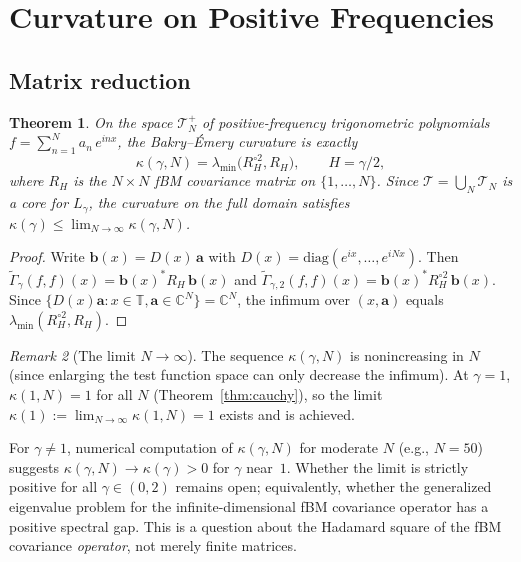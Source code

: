 \documentclass[11pt,a4paper]{article}
\theoremstyle{plain}
\newtheorem{theorem}{Theorem}[section]
\theoremstyle{definition}
\theoremstyle{remark}
\newtheorem{remark}[theorem]{Remark}
\newcommand{\C}{\mathbb{C}}
\newcommand{\T}{\mathbb{T}}
\begin{document}
\section{Curvature on Positive Frequencies}\label{sec:curvature}

\subsection{Matrix reduction}\label{sec:curv-pos}

\begin{theorem}\label{thm:curvature}
On the space $\mathcal{T}_N^+$ of positive-frequency trigonometric
polynomials $f = \sum_{n=1}^N a_n\,e^{inx}$, the Bakry--\'Emery
curvature is exactly
\begin{equation}\label{eq:kappa-def}
  \kappa(\gamma,N) = \lambda_{\min}\!\bigl(R_H^{\circ 2}, R_H\bigr),
  \qquad H = \gamma/2,
\end{equation}
where $R_H$ is the $N \times N$ fBM covariance matrix on $\{1,\ldots,N\}$.
Since $\mathcal{T} = \bigcup_N \mathcal{T}_N$ is a core for $L_\gamma$,
the curvature on the full domain satisfies
$\kappa(\gamma) \leq \lim_{N\to\infty} \kappa(\gamma,N)$.
\end{theorem}

\begin{proof}
Write $\mathbf{b}(x) = D(x)\,\mathbf{a}$ with
$D(x) = \mathrm{diag}(e^{ix},\ldots,e^{iNx})$. Then
$\widetilde{\Gamma}_\gamma(f,f)(x) = \mathbf{b}(x)^* R_H\,\mathbf{b}(x)$
and $\widetilde{\Gamma}_{\gamma,2}(f,f)(x) =
\mathbf{b}(x)^* R_H^{\circ 2}\,\mathbf{b}(x)$.
Since $\{D(x)\mathbf{a} : x \in \T, \mathbf{a} \in \C^N\} = \C^N$,
the infimum over $(x,\mathbf{a})$ equals
$\lambda_{\min}(R_H^{\circ 2}, R_H)$.
\end{proof}

\begin{remark}[The limit $N \to \infty$]
\label{rem:N-limit}
The sequence $\kappa(\gamma,N)$ is nonincreasing in $N$
(since enlarging the test function space can only decrease
the infimum).  At $\gamma = 1$, $\kappa(1,N) = 1$ for all
$N$ (Theorem~\ref{thm:cauchy}), so the limit
$\kappa(1) := \lim_{N\to\infty}\kappa(1,N) = 1$ exists
and is achieved.

For $\gamma \neq 1$, numerical computation of $\kappa(\gamma,N)$
for moderate $N$ (e.g., $N = 50$)
suggests $\kappa(\gamma,N) \to \kappa(\gamma) > 0$ for
$\gamma$ near~$1$.  Whether the limit is strictly positive
for all $\gamma \in (0,2)$ remains open; equivalently,
whether the generalized eigenvalue problem for the
infinite-dimensional fBM covariance operator has a positive
spectral gap.  This is a question about the Hadamard square
of the fBM covariance \emph{operator}, not merely finite
matrices.
\end{remark}
\end{document}
